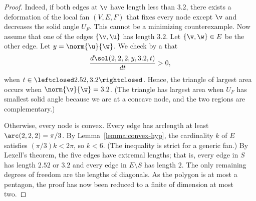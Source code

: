 \begin{proof}
  Indeed,%
 if both edges at $\v$ have length less than $3.2$, there
exists a deformation of the local fan $(V,E,F)$ that fixes every node
except $\v$ and decreases the solid angle $U_F$.  This cannot be a
minimizing counterexample.  Now assume that one of the edges
$\{\v,\u\}$ has length $3.2$.  Let $\{\v,\w\}\in E$ be the other edge.
Let
$y=\norm{\u}{\w}$.  We check by a  that
\[
\dfrac{d\sol(2,2,2,y,3.2,t)}{dt} >0,
\]
when $t\in\leftclosed2.52,3.2\rightclosed$.  Hence, the triangle of
largest area occurs when $\norm{\v}{\w}=3.2$.  (The triangle has
largest area when $U_F$ has smallest solid angle because we are at a
concave node, and the two regions are complementary.)


  Otherwise,
every node is convex.  Every edge has arclength at least
$\arc(2,2,2)=\pi/3$.  By Lemma~\ref{lemma:convex-hyp}, the cardinality
$k$ of $E$ satisfies $(\pi/3)k < 2\pi$, so $k<6$.  (The inequality is
strict for a generic fan.)  By Lexell's theorem, the five edges have
extremal lengths;  that is, every edge in $S$ has length $2.52$ or
$3.2$ and every edge in $E\setminus S$ has length $2$.  The only
remaining degrees of freedom are the lengths of diagonals.  As the
polygon is at most a pentagon, the proof has now been reduced to a
finite  of dimension at
most two.



\end{proof}
